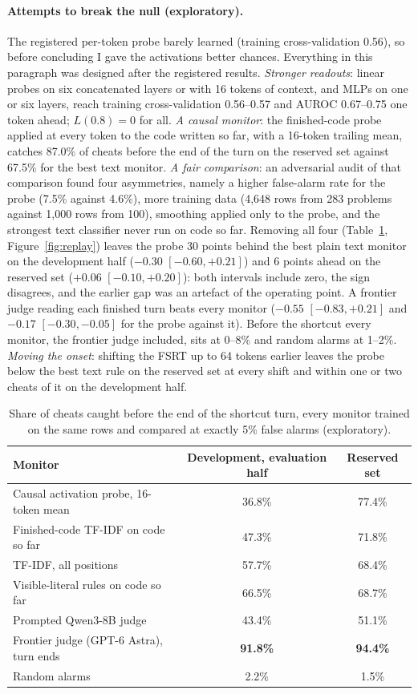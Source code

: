 \documentclass[10pt]{article}
\newcommand{\fsrt}{FSRT}
\begin{document}
\paragraph{Attempts to break the null (exploratory).} The registered per-token probe barely learned (training cross-validation 0.56), so before concluding I gave the activations better chances. Everything in this paragraph was designed after the registered results. \emph{Stronger readouts}: linear probes on six concatenated layers or with 16 tokens of context, and MLPs on one or six layers, reach training cross-validation 0.56--0.57 and AUROC 0.67--0.75 one token ahead; $L(0.8)=0$ for all. \emph{A causal monitor}: the finished-code probe applied at every token to the code written so far, with a 16-token trailing mean, catches 87.0\% of cheats before the end of the turn on the reserved set against 67.5\% for the best text monitor. \emph{A fair comparison}: an adversarial audit of that comparison found four asymmetries, namely a higher false-alarm rate for the probe (7.5\% against 4.6\%), more training data (4,648 rows from 283 problems against 1,000 rows from 100), smoothing applied only to the probe, and the strongest text classifier never run on code so far. Removing all four (Table~\ref{tab:fair}, Figure~\ref{fig:replay}) leaves the probe 30 points behind the best plain text monitor on the development half ($-0.30$ $[-0.60, +0.21]$) and 6 points ahead on the reserved set ($+0.06$ $[-0.10, +0.20]$): both intervals include zero, the sign disagrees, and the earlier gap was an artefact of the operating point. A frontier judge reading each finished turn beats every monitor ($-0.55$ $[-0.83, +0.21]$ and $-0.17$ $[-0.30, -0.05]$ for the probe against it). Before the shortcut every monitor, the frontier judge included, sits at 0--8\% and random alarms at 1--2\%. \emph{Moving the onset}: shifting the \fsrt{} up to 64 tokens earlier leaves the probe below the best text rule on the reserved set at every shift and within one or two cheats of it on the development half.

\begin{table}[ht]
\centering\small
\caption{Share of cheats caught before the end of the shortcut turn, every monitor trained on the same rows and compared at exactly 5\% false alarms (exploratory).}
\label{tab:fair}
\vspace{6pt}
\begin{tabular}{lcc}
\toprule
Monitor & Development, evaluation half & Reserved set \\
\midrule
Causal activation probe, 16-token mean & 36.8\% & 77.4\% \\
Finished-code TF-IDF on code so far & 47.3\% & 71.8\% \\
TF-IDF, all positions & 57.7\% & 68.4\% \\
Visible-literal rules on code so far & 66.5\% & 68.7\% \\
Prompted Qwen3-8B judge & 43.4\% & 51.1\% \\
Frontier judge (GPT-6 Astra), turn ends & \textbf{91.8\%} & \textbf{94.4\%} \\
Random alarms & 2.2\% & 1.5\% \\
\bottomrule
\end{tabular}
\end{table}
\end{document}
